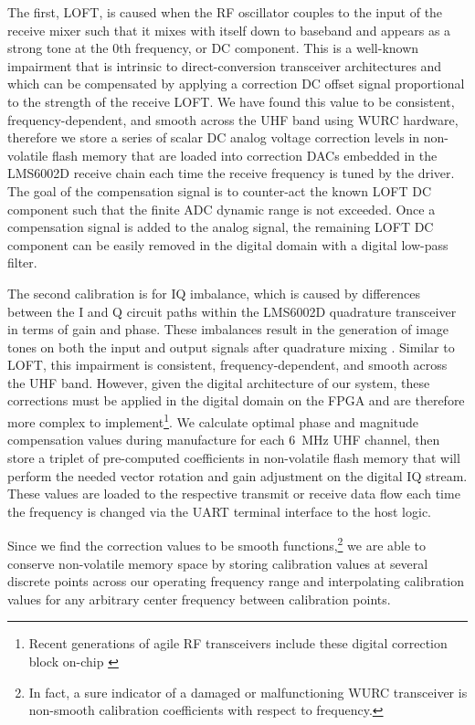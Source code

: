 	The first, \acf{LOFT}, is caused when the RF oscillator couples to the input of the receive mixer such that it mixes with itself down to baseband and appears as a strong tone at the 0th frequency, or DC component.
	This is a well-known impairment that is intrinsic to direct-conversion transceiver architectures and which can be compensated by applying a correction DC offset signal proportional to the strength of the receive \ac{LOFT}.
	We have found this value to be consistent, frequency-dependent, and smooth across the UHF band using \ac{WURC} hardware, therefore we store a series of scalar DC analog voltage correction levels in non-volatile flash memory that are loaded into correction DACs embedded in the LMS6002D receive chain each time the receive frequency is tuned by the driver.
	The goal of the compensation signal is to counter-act the known \ac{LOFT} DC component such that the finite \ac{ADC} dynamic range is not exceeded.
	Once a compensation signal is added to the analog signal, the remaining \ac{LOFT} DC component can be easily removed in the digital domain with a digital low-pass filter.

	The second calibration is for IQ imbalance, which is caused by differences between the I and Q circuit paths within the LMS6002D quadrature transceiver in terms of gain and phase.
	These imbalances result in the generation of image tones on both the input and output signals after quadrature mixing \cite{tubbax2005compensation}.
	Similar to \ac{LOFT}, this impairment is consistent, frequency-dependent, and smooth across the UHF band.
	However, given the digital architecture of our system, these corrections must be applied in the digital domain on the FPGA and are therefore more complex to implement\footnote{Recent generations of agile RF transceivers include these digital correction block on-chip \cite{lime2018lms7002M, adi2018adrv9009}}.
	We calculate optimal phase and magnitude compensation values during manufacture for each 6~MHz UHF channel, then store a triplet of pre-computed coefficients in non-volatile flash memory that will perform the needed vector rotation and gain adjustment on the digital IQ stream.
	These values are loaded to the respective transmit or receive data flow each time the frequency is changed via the UART terminal interface to the host logic.
	
	Since we find the correction values to be smooth functions,\footnote{In fact, a sure indicator of a damaged or malfunctioning \ac{WURC} transceiver is non-smooth calibration coefficients with respect to frequency.} we are able to conserve non-volatile memory space by storing calibration values at several discrete points across our operating frequency range and interpolating calibration values for any arbitrary center frequency between calibration points.
	

